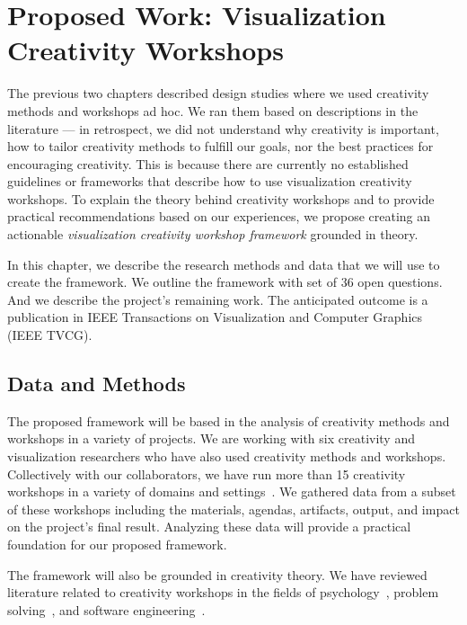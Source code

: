 
\chapter{Proposed Work: Visualization Creativity Workshops}
\label{ch:creativity}

The previous two chapters described design studies where we used creativity methods and workshops ad hoc. We ran them based on descriptions in the literature --- in retrospect, we did not understand why creativity is important, how to tailor creativity methods to fulfill our goals, nor the best practices for encouraging creativity. This is because there are currently no established guidelines or frameworks that describe how to use visualization creativity workshops. To explain the theory behind creativity workshops and to provide practical recommendations based on our experiences, we propose creating an actionable \emph{visualization creativity workshop framework} grounded in theory. 

In this chapter, we describe the research methods and data that we will use to create the framework. We outline the framework with set of 36 open questions. And we describe the project's remaining work. The anticipated outcome is a publication in IEEE Transactions on Visualization and Computer Graphics (IEEE TVCG).

\section{Data and Methods}

The proposed framework will be based in the analysis of creativity methods and workshops in a variety of projects. We are working with six creativity and visualization researchers who have also used creativity methods and workshops. Collectively with our collaborators, we have run more than 15 creativity workshops in a variety of domains and settings~\cite{Dykes2010,Goodwin2013,Goodwin2016,Koh2011,Walker2013,Rogers2016,Jones2008,Jones2007,Nobre2017,Horkoff2015,Lisle2017,Dove2015,Kerzner2017,Kerzner2015,Maiden2004,Maiden2005}. We gathered data from a subset of these workshops including the materials, agendas, artifacts, output, and impact on the project's final result. Analyzing these data will provide a practical foundation for our proposed framework.

The framework will also be grounded in creativity theory. We have reviewed literature related to creativity workshops in the fields of psychology~\cite{Csikszentmihalyi1997,Gardiner1993,Kaufman2006,Sawyer2006,Sawyer2003}, problem solving~\cite{Michalko2006,Gordon1961,Couger1993,DeBono1983,Osborn1953,Miller1989}, and software engineering~\cite{Sanders2008,Dove2015,Sherwin2011,Muller1993,Sanders2010,Mahaux2014,Mahaux2014,Mahaux2007,Jones2008,Jones2007,Maiden2007,Maiden2005,Maiden2004}.

